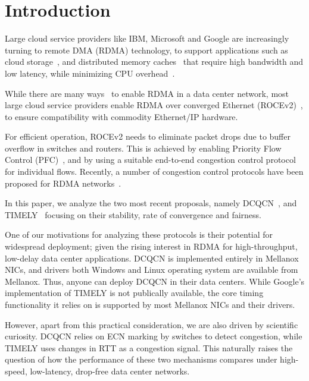 \section{Introduction}


Large cloud service providers like IBM, Microsoft and Google are increasingly
turning to remote DMA (RDMA) technology, to support applications such as cloud
storage~\cite{erasure-storage}, and distributed memory caches~\cite{farm} that
require high bandwidth and low latency, while minimizing CPU
overhead~\cite{tcp-bolt,dcqcn,timely}.

While there are many ways~\cite{ib-spec, rfc-iwarp,chelsio,rocve2} to enable
RDMA in a data center network, most large cloud service providers enable RDMA
over converged Ethernet (ROCEv2)~\cite{rocev2}, to ensure compatibility with
commodity Ethernet/IP hardware. 

For efficient operation, ROCEv2 needs to eliminate packet drops due to buffer
overflow in switches and routers. This is achieved by enabling Priority Flow
Control (PFC)~\cite{pfc}, and by using a suitable end-to-end congestion control
protocol for individual flows. Recently, a number of congestion control
protocols have been proposed for RDMA networks~\cite{tcp-bolt,dcqcn,timely}.  


In this paper, we analyze the two most recent proposals, namely
DCQCN~\cite{dcqcn}, and TIMELY~\cite{timely} focusing on their stability, rate
of convergence and fairness.


One of our motivations for analyzing these protocols is their potential for
widespread deployment; given the rising interest in RDMA for high-throughput,
low-delay data center applications. DCQCN is implemented entirely in Mellanox
NICs, and drivers both Windows and Linux operating system are available from
Mellanox. Thus, anyone can deploy DCQCN in their data centers. While Google's
implementation of TIMELY is not publically available, the core timing
functionality it relies on is supported by most Mellanox NICs and their drivers. 

However, apart from this practical consideration, we are also driven by
scientific curiosity. DCQCN relies on ECN marking by switches to detect
congestion, while TIMELY uses changes in RTT as a congestion signal. This
naturally raises the question of how the performance of these two mechanisms
compares under high-speed, low-latency, drop-free data center networks.

